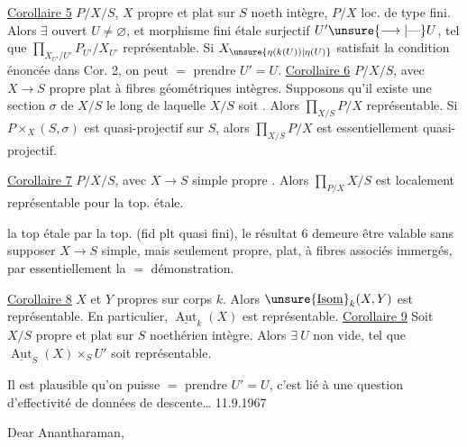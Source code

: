 \uline{Corollaire 5} $P/X/S$, $X$ propre et plat sur $S$ noeth intègre, $P/X$ loc. de type fini. Alors $\exists$  ouvert $U\ne\varnothing$, et morphisme fini étale surjectif $U'\unsure{\longrightarrow|\text{—}}U$, tel que $\prod_{X_{U'}/U'}P_{U'}/X_{U'}$ représentable. Si $X_{\unsure{\eta(k(U))|\eta(U)}}$ satisfait la condition énoncée dans Cor. 2, on peut $=$ prendre $U'=U$.
\uline{Corollaire 6} $P/X/S$, avec $X\to S$ propre plat à fibres géométriques intègres. Supposons qu'il existe une section $\sigma$ de $X/S$ le long de laquelle $X/S$ soit   . Alors $\prod_{X/S}P/X$ représentable. Si $P\mathbin{\times}_X(S,\sigma)$ est quasi-projectif sur $S$, alors $\prod_{X/S}P/X$ est essentiellement quasi-projectif.

\uline{Corollaire 7} $P/X/S$, avec $X\to S$ simple propre  . Alors $\prod_{P/X}X/S$ est localement représentable pour la top. étale.

 la top étale par la top.  (fid plt quasi fini), le résultat 6 demeure être valable sans supposer $X\to S$ simple, mais seulement propre, plat, à fibres   associés immergés, par essentiellement la $=$ démonstration.

\uline{Corollaire 8} $X$ et $Y$ propres sur corps $k$. Alors $\unsure{\underline{\operatorname{Isom}}}_k(X,Y)$ est représentable. En particulier, $\underline{\operatorname{Aut}}_k(X)$ est représentable.
\uline{Corollaire 9} Soit $X/S$ propre et plat sur $S$ noethérien intègre. Alors $\exists\ U$ non vide,   tel que $\underline{\operatorname{Aut}}_S(X)\times_S U'$ soit représentable.

Il est plausible qu'on puisse $=$ prendre $U'=U$, c'est lié à une question d'effectivité de données de descente\ldots
{}
11.9.1967

Dear Anantharaman,

